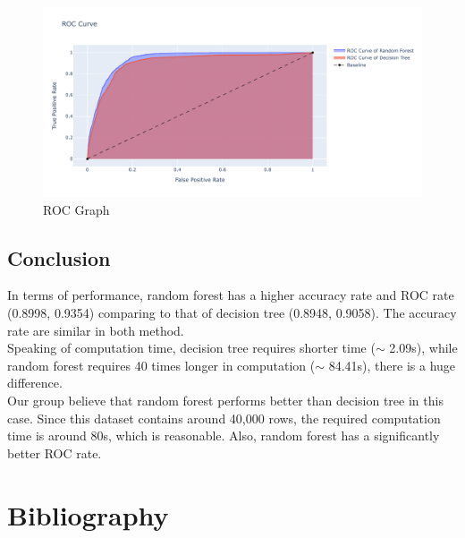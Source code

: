 \documentclass[11pt,a4paper]{article}
\begin{document}
    
    \begin{figure}[H]
        \centering
        \includegraphics[width = \textwidth]{plot/classification/roc.pdf}
        \caption{ROC Graph}
        \label{fig:roc}
    \end{figure}

    
    
    \subsection{Conclusion}
    In terms of performance, random forest has a higher accuracy rate and ROC rate (0.8998, 0.9354) comparing to that of decision tree (0.8948, 0.9058). The accuracy rate are similar in both method. \\
    Speaking of computation time, decision tree requires shorter time ($\sim$ 2.09s), while random forest requires 40 times longer in computation ($\sim$ 84.41s), there is a huge difference. \\
    Our group believe that random forest performs better than decision tree in this case. Since this dataset contains around 40,000 rows, the required computation time is around 80s, which is reasonable. Also, random forest has a significantly better ROC rate.
    
    
    \newpage
    \section{Bibliography}
    
\end{document}
